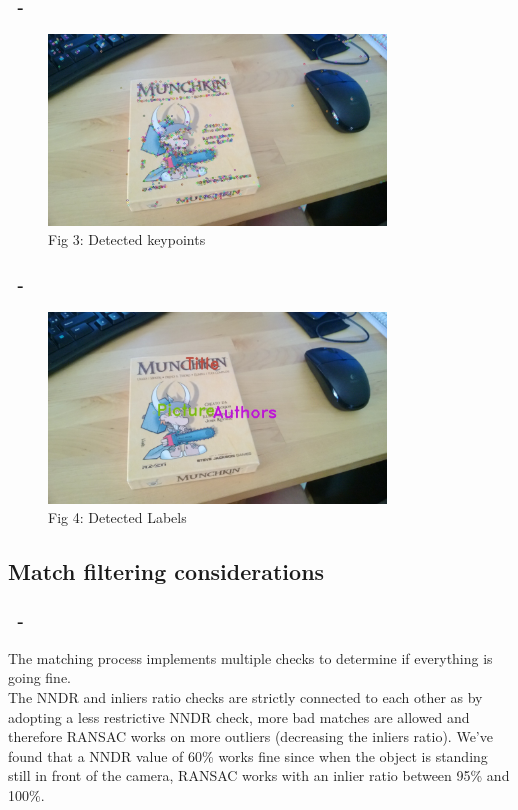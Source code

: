 \documentclass{beamer}
\begin{document}
  \begin{frame}
    \frametitle{\insertsection\ - \insertsubsection}
	\begin{figure}
		\centering
		\includegraphics[width=0.8\textwidth]{images/sampleKeypoints.jpg}\\
		Fig 3: Detected keypoints
	\end{figure}
  \end{frame}

  \begin{frame}
    \frametitle{\insertsection\ - \insertsubsection}
	\begin{figure}
		\centering
		\includegraphics[width=0.8\textwidth]{images/sampleLabels.jpg}\\
		Fig 4: Detected Labels
	\end{figure}
  \end{frame}

  \subsection{Match filtering considerations}

  \begin{frame}
	\frametitle{\insertsection\ - \insertsubsection}
	The matching process implements multiple checks to determine if everything
	is going fine.\\
	The NNDR and inliers ratio checks are strictly connected to each other
	as by adopting a less restrictive NNDR check, more bad matches are allowed
	and therefore RANSAC works on more outliers (decreasing the inliers ratio).
	We've found that a NNDR value of 60\% works fine since when the object is
	standing still in front of the camera, RANSAC works with an inlier ratio
	between 95\% and 100\%.
  \end{frame}
\end{document}
